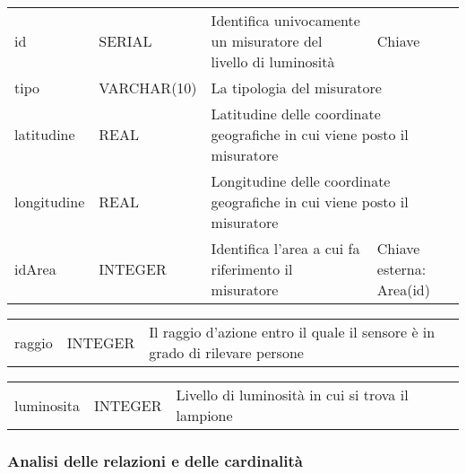 \begin{center}
    \begin{tabularx}{\textwidth}{|l|l|l|X|}
        \hline
        \rowcolor{gray!30}
        \multicolumn{4}{|c|}{\textbf{MISURATORE}}\\
        \hline
        id & SERIAL & Identifica univocamente un misuratore del livello di luminosità & Chiave\\
        \hline
        tipo & VARCHAR(10) & \multicolumn{2}{l|}{La tipologia del misuratore} \\
        \hline
        latitudine & REAL & \multicolumn{2}{l|}{Latitudine delle coordinate geografiche in cui viene posto il misuratore} \\
        \hline
        longitudine & REAL & \multicolumn{2}{l|}{Longitudine delle coordinate geografiche in cui viene posto il misuratore} \\
        \hline
        idArea & INTEGER & Identifica l'area a cui fa riferimento il misuratore & Chiave esterna: Area(id)\\
        \hline
    \end{tabularx}
\end{center}

\begin{center}
    \begin{tabularx}{\textwidth}{|l|l|X}
        \hline
        \rowcolor{gray!30}
        \multicolumn{3}{|c|}{\textbf{SENSORE}}\\
        \hline
        raggio & INTEGER & Il raggio d'azione entro il quale il sensore è in grado di rilevare persone \\
        \hline
    \end{tabularx}
\end{center}

\begin{center}
    \begin{tabularx}{\textwidth}{|l|l|X|}
        \hline
        \rowcolor{gray!30}
        \multicolumn{3}{|c|}{\textbf{LAMPIONE}}\\
        \hline
        luminosita & INTEGER & Livello di luminosità in cui si trova il lampione \\
        \hline
    \end{tabularx}
\end{center}

\subsubsection{Analisi delle relazioni e delle cardinalità}

